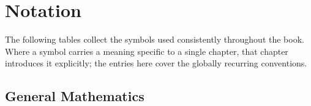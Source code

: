 
\chapter*{Notation}

The following tables collect the symbols used consistently throughout the
book.  Where a symbol carries a meaning specific to a single chapter, that
chapter introduces it explicitly; the entries here cover the globally
recurring conventions.

\section*{General Mathematics}

